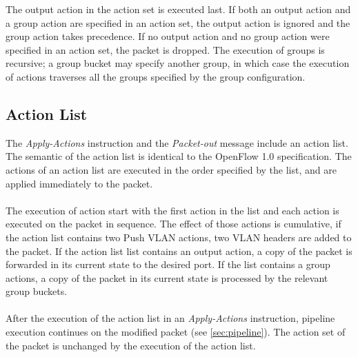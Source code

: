 \documentclass[10pt]{article}
\begin{document}
The output action in the action set is executed last. If both an output action and a group action are specified in an action set, the output action is ignored and the group action takes precedence. If no output action and no group action were specified in an action set, the packet is dropped. The execution of groups is recursive; a group bucket may specify another group, in which case the execution of actions traverses all the groups specified by the group configuration.

\subsection{Action List}
\label{ft:actionlist}

The \textit{Apply-Actions} instruction and the \textit{Packet-out} message include an action list. The semantic of the action list is identical to the OpenFlow 1.0 specification. The actions of an action list are executed in the order specified by the list, and are applied immediately to the packet.
\\\\
The execution of action start with the first action in the list and each action is executed on the packet in sequence. The effect of those actions is cumulative, if the action list contains two Push VLAN actions, two VLAN headers are added to the packet. If the action list list contains an output action, a copy of the packet is forwarded in its current state to the desired port. If the list contains a group actions, a copy of the packet in its current state is processed by the relevant group buckets.
\\\\
After the execution of the action list in an \textit{Apply-Actions} instruction, pipeline execution continues on the modified packet (see \ref{sec:pipeline}). The action set of the packet is unchanged by the execution of the action list.
\end{document}
